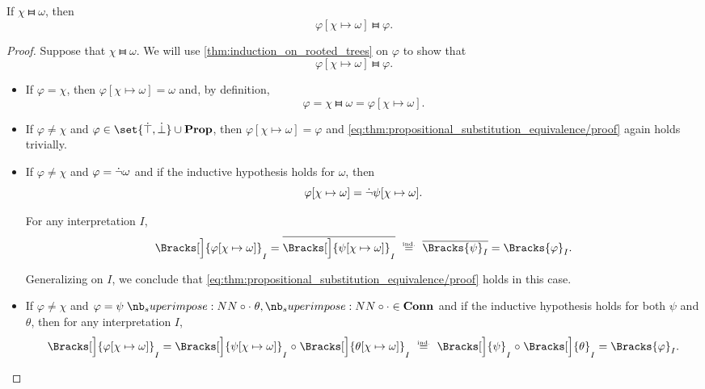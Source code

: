 \begin{proposition}\label{thm:propositional_substitution_equivalence}
  If \( \chi \gleichstark \omega \), then
  \begin{equation*}
    \varphi[\chi \mapsto \omega] \gleichstark \varphi.
  \end{equation*}
\end{proposition}
\begin{proof}
  Suppose that \( \chi \gleichstark \omega \). We will use \cref{thm:induction_on_rooted_trees} on \( \varphi \) to show that
  \begin{equation}\label{eq:thm:propositional_substitution_equivalence/proof}
    \varphi[\chi \mapsto \omega] \gleichstark \varphi.
  \end{equation}

  \begin{itemize}
    \item If \( \varphi = \chi \), then \( \varphi[\chi \mapsto \omega] = \omega \) and, by definition,
    \begin{equation*}
      \varphi = \chi \gleichstark \omega = \varphi[\chi \mapsto \omega].
    \end{equation*}

    \item If \( \varphi \neq \chi \) and \( \varphi \in \set{ \syntop, \synbot } \cup \op*{Prop} \), then \( \varphi[\chi \mapsto \omega] = \varphi \) and \eqref{eq:thm:propositional_substitution_equivalence/proof} again holds trivially.

    \item If \( \varphi \neq \chi \) and \( \varphi = \dot{\neg} \omega \) and if the inductive hypothesis holds for \( \omega \), then
    \begin{equation*}
      \varphi[\chi \mapsto \omega] = \dot{\neg} \psi[\chi \mapsto \omega].
    \end{equation*}

    For any interpretation \( I \),
    \begin{equation*}
      \Bracks[\Big]{ \varphi[\chi \mapsto \omega] }_I
      =
      \oline{\Bracks[\Big]{\psi[\chi \mapsto \omega] }_I}
      \reloset {\T{ind.}} =
      \oline{\Bracks{\psi}_I}
      =
      \Bracks{\varphi}_I.
    \end{equation*}

    Generalizing on \( I \), we conclude that \eqref{eq:thm:propositional_substitution_equivalence/proof} holds in this case.

    \item If \( \varphi \neq \chi \) and \( \varphi = \psi \syncirc \theta, {\syncirc} \in \op*{Conn} \) and if the inductive hypothesis holds for both \( \psi \) and \( \theta \), then for any interpretation \( I \),
    \begin{equation*}
      \Bracks[\Big]{ \varphi[\chi \mapsto \omega] }_I
      =
      \Bracks[\Big]{ \psi[\chi \mapsto \omega] }_I \relcirc \Bracks[\Big]{ \theta[\chi \mapsto \omega] }_I
      \reloset {\T{ind.}} =
      \Bracks[\Big]{\psi}_I \relcirc \Bracks[\Big]{\theta}_I
      =
      \Bracks{\varphi}_I.
    \end{equation*}


\end{itemize}
\end{proof}
